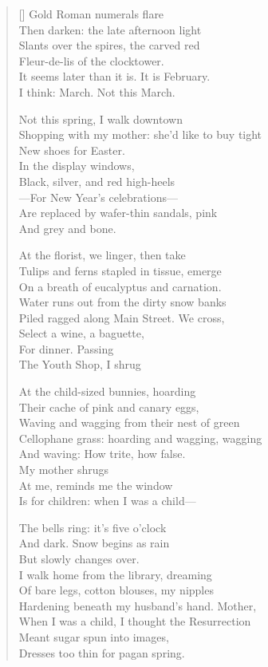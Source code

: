 \settowidth{\versewidth}{Shopping with my mother: she'd like to buy tight}
\begin{verse}[\versewidth]
Gold Roman numerals flare\\
Then darken: the late afternoon light\\
Slants over the spires, the carved red\\
Fleur-de-lis  of the clocktower.\\
It seems later than it is. It is February.\\
I think: March. Not this March.

Not this spring, I walk downtown\\
Shopping with my mother: she'd like to buy tight\\
New shoes for Easter.\\
In the display windows,\\
Black, silver, and red high-heels\\
---For New Year's celebrations---\\
Are replaced by wafer-thin sandals, pink\\
And grey and bone.

At the florist, we linger, then take\\
Tulips and ferns stapled in tissue, emerge\\
On a breath of eucalyptus and carnation.\\
Water runs out from the dirty snow banks\\
Piled ragged along Main Street.     We cross,\\
Select a wine, a baguette,\\
For dinner.    Passing\\
The Youth Shop, I shrug

At the child-sized bunnies, hoarding\\
Their cache of pink and canary eggs,\\
Waving and wagging from their nest of green\\
Cellophane grass: hoarding and wagging, wagging\\
And waving: How trite, how false.\\
My mother shrugs\\
At me, reminds me the window\\
Is for children: when I was a child---

The bells ring: it's five o'clock\\
And dark. Snow begins as rain\\
But slowly changes over.\\
I walk home from the library, dreaming\\
Of bare legs, cotton blouses, my nipples\\
Hardening beneath my husband's hand.   Mother,\\
When I was a child, I thought the Resurrection\\
Meant sugar spun into images,\\

Dresses too thin for pagan spring.
\end{verse}
